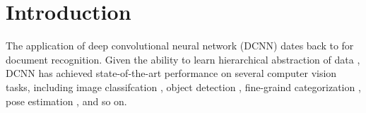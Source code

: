 \section{Introduction}
\label{sec:intro}

The application of deep convolutional neural network (DCNN) dates back to \citet{LeCun1998} for document recognition. Given the ability to learn hierarchical abstraction of data \citep{zeiler2014visualizing}, DCNN has achieved state-of-the-art performance on several computer vision tasks, including image classifcation \citet{KrizhevskyNIPS2013, papandreou2014untangling, sermanet2013overfeat, simonyan2014very, szegedy2014going}, object detection \citet{girshick2014rcnn}, fine-graind categorization \citet{zhang2014part}, pose estimation \citet{chen2014articulated, tompson2014joint}, and so on. 
